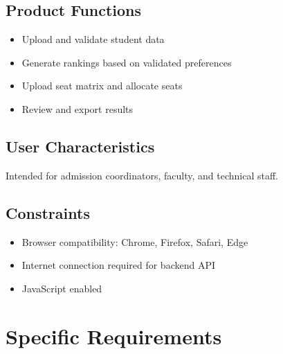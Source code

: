 \documentclass[12pt,a4paper]{article}
\begin{document}
\subsection{Product Functions}
\begin{itemize}
    \item Upload and validate student data
    \item Generate rankings based on validated preferences
    \item Upload seat matrix and allocate seats
    \item Review and export results
\end{itemize}

\subsection{User Characteristics}
Intended for admission coordinators, faculty, and technical staff.

\subsection{Constraints}
\begin{itemize}
    \item Browser compatibility: Chrome, Firefox, Safari, Edge
    \item Internet connection required for backend API
    \item JavaScript enabled
\end{itemize}

\section{Specific Requirements}
\end{document}
